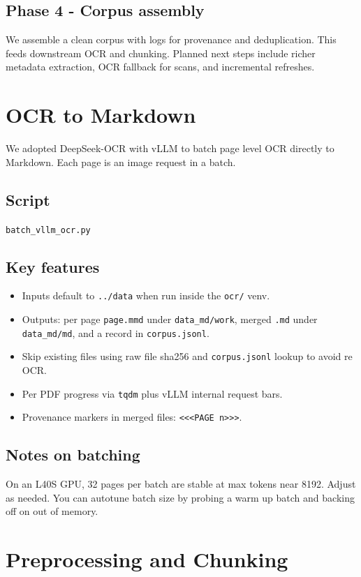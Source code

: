 \documentclass[11pt]{article}
\begin{document}
\subsection{Phase 4 - Corpus assembly}
We assemble a clean corpus with logs for provenance and deduplication. This feeds downstream OCR and chunking. Planned next steps include richer metadata extraction, OCR fallback for scans, and incremental refreshes.

\section{OCR to Markdown}
We adopted DeepSeek-OCR with vLLM to batch page level OCR directly to Markdown. Each page is an image request in a batch.

\subsection{Script}
\texttt{batch\_vllm\_ocr.py}

\subsection{Key features}
\begin{itemize}[leftmargin=1.2em]
  \item Inputs default to \texttt{../data} when run inside the \texttt{ocr/} venv.
  \item Outputs: per page \texttt{page.mmd} under \texttt{data\_md/work}, merged \texttt{.md} under \texttt{data\_md/md}, and a record in \texttt{corpus.jsonl}.
  \item Skip existing files using raw file sha256 and \texttt{corpus.jsonl} lookup to avoid re OCR.
  \item Per PDF progress via \texttt{tqdm} plus vLLM internal request bars.
  \item Provenance markers in merged files: \texttt{<<<PAGE n>>>}.
\end{itemize}

\subsection{Notes on batching}
On an L40S GPU, 32 pages per batch are stable at max tokens near 8192. Adjust as needed. You can autotune batch size by probing a warm up batch and backing off on out of memory.

\section{Preprocessing and Chunking}
\end{document}
